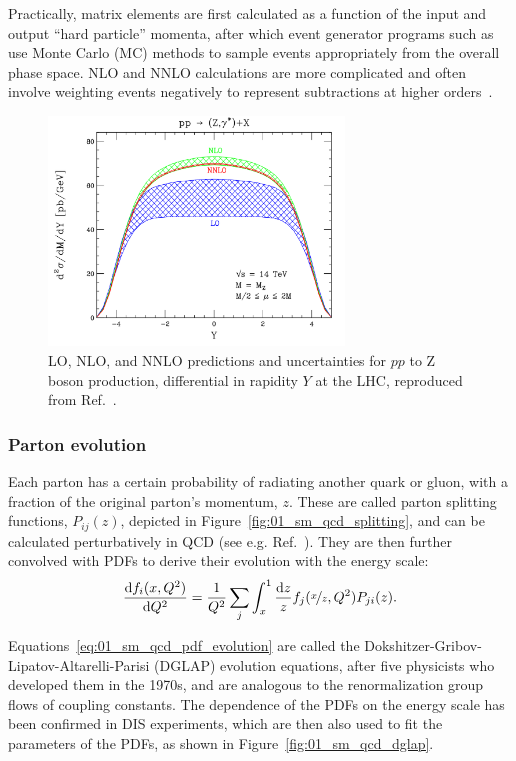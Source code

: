 Practically, matrix elements are first calculated as a function of the input and output ``hard particle'' momenta, after which event generator programs such as \MADGRAPH~\cite{Alwall:2014hca} use Monte Carlo (MC) methods to sample events appropriately from the overall phase space.
NLO and NNLO calculations are more complicated and often involve weighting events negatively to represent subtractions at higher orders~\cite{Danziger:2021xvr}.

\begin{figure}[ht]
	\centering
	\includegraphics[width=0.7\textwidth]{figures/01-SM-03-SM/qcd/Zxs.png}
	\caption{LO, NLO, and NNLO predictions and uncertainties for $pp$ to Z boson production, differential in rapidity $Y$ at the LHC, reproduced from Ref.~\cite{Anastasiou:2003ds}.}
	\label{fig:01_sm_qcd_qcd_nlo}
\end{figure}


\subsubsection{Parton evolution}

Each parton has a certain probability of radiating another quark or gluon, with a fraction of the original parton's momentum, $z$.
These are called parton splitting functions, $P_{ij}(z)$, depicted in Figure~\ref{fig:01_sm_qcd_splitting}, and can be calculated perturbatively in QCD (see e.g. Ref.~\cite{Salam:2010zt}).
They are then further convolved with PDFs to derive their evolution with the energy scale:
\begin{equation}
	\label{eq:01_sm_qcd_pdf_evolution}
	\frac{\mathrm{d} f_i(x, Q^2)}{\mathrm{d} Q^2} = \frac{1}{Q^2} \sum_{j} \int_x^1 \frac{\mathrm{d} z}{z} f_j(\nicefrac{x}{z}, Q^2) P_{ji}(z).
\end{equation}

Equations~\ref{eq:01_sm_qcd_pdf_evolution} are called the Dokshitzer-Gribov-Lipatov-Altarelli-Parisi (DGLAP) evolution equations, after five physicists who developed them in the 1970s, and are analogous to the renormalization group flows of coupling constants.
The dependence of the PDFs on the energy scale has been confirmed in DIS experiments, which are then also used to fit the parameters of the PDFs, as shown in Figure~\ref{fig:01_sm_qcd_dglap}.

